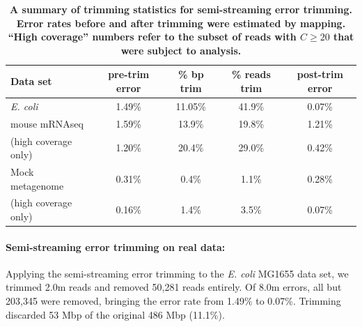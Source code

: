 \documentclass{article}
\begin{document}
\begin{table}
\begin{tabular}{|l|c|c|c|c|}
\hline
Data set        & pre-trim error & \% bp trim & \% reads trim & post-trim error \\
\hline
{\em E. coli}   & 1.49\%         & 11.05\%          & 41.9\%      & 0.07\% \\
\hline
mouse mRNAseq   & 1.59\%         & 13.9\%           & 19.8\%      & 1.21\% \\
(high coverage only) & 1.20\%    & 20.4\%           & 29.0\%      & 0.42\% \\
\hline
Mock metagenome & 0.31\%         & 0.4\%            & 1.1\%       & 0.28\% \\
(high coverage only) & 0.16\%    & 1.4\%            & 3.5\%       & 0.07\% \\
\hline
\end{tabular}

\caption{{\bf A summary of trimming statistics for semi-streaming
    error trimming.  Error rates before and after trimming were
    estimated by mapping. ``High coverage'' numbers refer to the
    subset of reads with $C \geq 20$ that were subject to analysis.}}
\label{tab:trimming}
\end{table}

\paragraph{Semi-streaming error trimming on real data:}



%

Applying the semi-streaming error trimming to the {\em E. coli} MG1655 data
set, we trimmed 2.0m reads and removed 50,281
reads entirely.  Of 8.0m errors, all but 203,345 were removed,
bringing the error rate from 1.49\% to 0.07\%.  Trimming discarded 53
Mbp of the original 486 Mbp (11.1\%).
\end{document}
